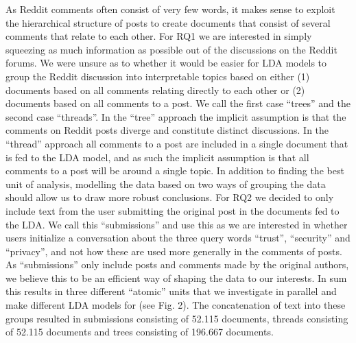 \documentclass{article}
\begin{document}
As Reddit comments often consist of very few words, it makes sense to exploit the hierarchical structure of posts to create documents that consist of several comments that relate to each other. For RQ1 we are interested in simply squeezing as much information as possible out of the discussions on the Reddit forums. We were unsure as to whether it would be easier for LDA models to group the Reddit discussion into interpretable topics based on either (1) documents based on all comments relating directly to each other or (2) documents based on all comments to a post. We call the first case “trees” and the second case “threads”. In the “tree” approach the implicit assumption is that the comments on Reddit posts diverge and constitute distinct discussions. In the “thread” approach all comments to a post are included in a single document that is fed to the LDA model, and as such the implicit assumption is that all comments to a post will be around a single topic. In addition to finding the best unit of analysis, modelling the data based on two ways of grouping the data should allow us to draw more robust conclusions. 
For RQ2 we decided to only include text from the user submitting the original post in the documents fed to the LDA. We call this “submissions” and use this as we are interested in whether users initialize a conversation about the three query words “trust”, “security” and “privacy”, and not how these are used more generally in the comments of posts. As “submissions” only include posts and comments made by the original authors, we believe this to be an efficient way of shaping the data to our interests. In sum this results in three different “atomic” units that we investigate in parallel and make different LDA models for (see Fig. 2). The concatenation of text into these groups resulted in submissions consisting of 52.115 documents, threads consisting of 52.115 documents and trees consisting of 196.667 documents. 
\end{document}
